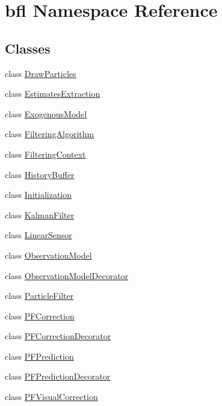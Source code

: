 \hypertarget{namespacebfl}{}\section{bfl Namespace Reference}
\label{namespacebfl}
\subsection*{Classes}
\begin{DoxyCompactItemize}
\item 
class \mbox{\hyperlink{classbfl_1_1DrawParticles}{Draw\+Particles}}
\item 
class \mbox{\hyperlink{classbfl_1_1EstimatesExtraction}{Estimates\+Extraction}}
\item 
class \mbox{\hyperlink{classbfl_1_1ExogenousModel}{Exogenous\+Model}}
\item 
class \mbox{\hyperlink{classbfl_1_1FilteringAlgorithm}{Filtering\+Algorithm}}
\item 
class \mbox{\hyperlink{classbfl_1_1FilteringContext}{Filtering\+Context}}
\item 
class \mbox{\hyperlink{classbfl_1_1HistoryBuffer}{History\+Buffer}}
\item 
class \mbox{\hyperlink{classbfl_1_1Initialization}{Initialization}}
\item 
class \mbox{\hyperlink{classbfl_1_1KalmanFilter}{Kalman\+Filter}}
\item 
class \mbox{\hyperlink{classbfl_1_1LinearSensor}{Linear\+Sensor}}
\item 
class \mbox{\hyperlink{classbfl_1_1ObservationModel}{Observation\+Model}}
\item 
class \mbox{\hyperlink{classbfl_1_1ObservationModelDecorator}{Observation\+Model\+Decorator}}
\item 
class \mbox{\hyperlink{classbfl_1_1ParticleFilter}{Particle\+Filter}}
\item 
class \mbox{\hyperlink{classbfl_1_1PFCorrection}{P\+F\+Correction}}
\item 
class \mbox{\hyperlink{classbfl_1_1PFCorrectionDecorator}{P\+F\+Correction\+Decorator}}
\item 
class \mbox{\hyperlink{classbfl_1_1PFPrediction}{P\+F\+Prediction}}
\item 
class \mbox{\hyperlink{classbfl_1_1PFPredictionDecorator}{P\+F\+Prediction\+Decorator}}
\item 
class \mbox{\hyperlink{classbfl_1_1PFVisualCorrection}{P\+F\+Visual\+Correction}}
\item 

\end{DoxyCompactItemize}
